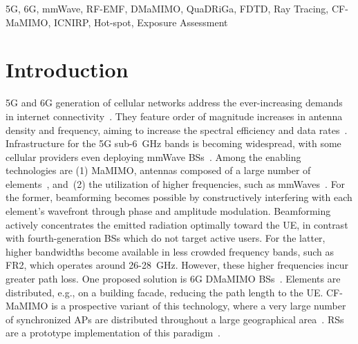 \documentclass{IEEEtran}
\begin{document}
\begin{IEEEkeywords}
5G, 6G, mmWave, RF-EMF, DMaMIMO, QuaDRiGa, FDTD, Ray Tracing, CF-MaMIMO, ICNIRP, Hot-spot, Exposure Assessment
\end{IEEEkeywords}

\section{Introduction}
\label{sec:introduction}
 \gls{5G} and \gls{6G} generation of cellular networks address the ever-increasing demands in internet connectivity~\cite{general5G}. They feature order of magnitude increases in antenna density and frequency, aiming to increase the spectral efficiency and data rates~\cite{increases5G}. Infrastructure for the \gls{5G} sub-6~GHz bands is becoming widespread, with some cellular providers even deploying \gls{mmWave} \glspl{BS}~\cite{deployment}. Among the enabling technologies are (1) \gls{MaMIMO}, antennas composed of a large number of elements~\cite{MIMO}, and~(2) the utilization of higher frequencies, such as \glspl{mmWave}~\cite{mmWave}. For the former, beamforming becomes possible by constructively interfering with each element's wavefront through phase and amplitude modulation. Beamforming actively concentrates the emitted radiation optimally toward the \gls{UE}, in contrast with fourth-generation \glspl{BS} which do not target active users. For the latter, higher bandwidths become available in less crowded frequency bands, such as FR2, which operates around 26-28~GHz. However, these higher frequencies incur greater path loss. One proposed solution is \gls{6G} \gls{DMaMIMO} \glspl{BS}~\cite{Book You}. Elements are distributed, e.g., on a building facade, reducing the path length to the \gls{UE}. \gls{CF-MaMIMO} is a prospective variant of this technology, where a very large number of synchronized \glspl{AP} are distributed throughout a large geographical area~\cite{Ngo2015, Ngo2017}. \glspl{RS} are a prototype implementation of this paradigm~\cite{radiostripes}. \\
\end{document}
